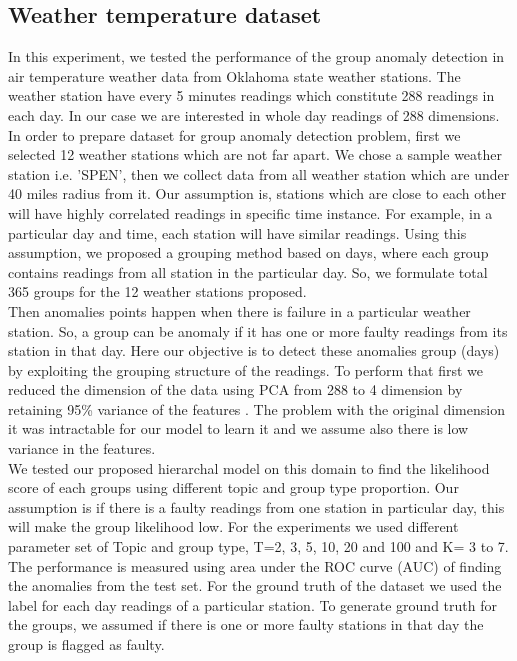 \documentclass[letterpaper]{article}
\begin{document}
\subsection{Weather temperature dataset}
In this experiment, we tested the performance of the group anomaly detection in air temperature weather data from Oklahoma state weather stations. The weather station have every 5 minutes readings which constitute 288 readings in each day. In our case we are interested in whole day readings of 288 dimensions.\\
 In order to prepare dataset for group anomaly detection problem, first we selected 12 weather stations which are not far apart. We chose a sample weather station i.e. 'SPEN', then we collect data from all weather station which are under 40 miles radius from it. Our assumption is, stations which are close to each other will have highly correlated readings in specific time instance. For example, in a particular day and time, each station will have similar readings. Using this assumption, we proposed a grouping method based on days, where each group contains readings from all station in the particular day. So, we formulate total 365 groups for the 12 weather stations proposed.\\
 Then anomalies points happen when there is failure in a particular weather station. So, a group can be anomaly if it has one or more faulty readings from its station in that day. Here our objective is to detect these anomalies group (days) by exploiting the grouping structure of the readings. To perform that first we reduced the dimension of the data using PCA from 288 to 4 dimension by retaining 95\% variance of the features . The problem with the original dimension it was intractable for our model to learn it and we assume also there is low variance in the features.  \\
We tested our proposed hierarchal model on this domain to find the likelihood score of each groups using different topic and group type proportion.  Our assumption is if there is a faulty readings from one station in particular day, this will make the group likelihood low. For the experiments we used different parameter set of Topic and group type, T=2, 3, 5, 10, 20 and 100 and K= 3 to 7.  The performance is measured using area under the ROC curve (AUC) of finding the anomalies from the test set.  For the ground truth of the dataset we used the label for each day readings of a particular station.  To generate ground truth for the groups, we assumed if there is one or more faulty stations in that day the group is flagged as faulty.\\  
\end{document}
